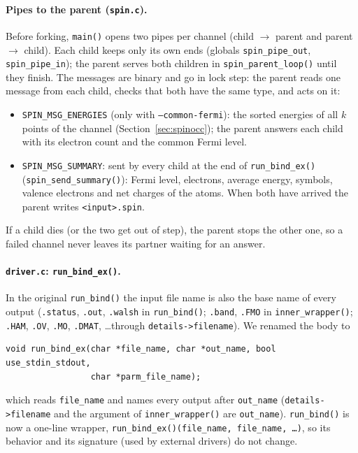 \documentclass[11pt,a4paper]{article}
\newcommand{\file}[1]{\texttt{#1}}
\newcommand{\fn}[1]{\texttt{#1()}}
\newcommand{\var}[1]{\texttt{#1}}
\newcommand{\opt}[1]{\texttt{#1}}
\begin{document}
\paragraph{Pipes to the parent (\file{spin.c}).} Before forking, \fn{main} opens two
pipes per channel (child $\to$ parent and parent $\to$ child). Each child keeps only its
own ends (globals \var{spin\_pipe\_out}, \var{spin\_pipe\_in}); the parent serves both
children in \fn{spin\_parent\_loop} until they finish. The messages are binary and go in
lock step: the parent reads one message from each child, checks that both have the same
type, and acts on it:
\begin{itemize}
\item \texttt{SPIN\_MSG\_ENERGIES} (only with \opt{--common-fermi}): the sorted energies of
  all $k$ points of the channel (Section~\ref{sec:spinocc}); the parent answers each child
  with its electron count and the common Fermi level.
\item \texttt{SPIN\_MSG\_SUMMARY}: sent by every child at the end of \fn{run\_bind\_ex}
  (\fn{spin\_send\_summary}): Fermi level, electrons, average energy, symbols, valence
  electrons and net charges of the atoms. When both have arrived the parent writes
  \texttt{<input>.spin}.
\end{itemize}
If a child dies (or the two get out of step), the parent stops the other one, so a
failed channel never leaves its partner waiting for an answer.

\paragraph{\file{driver.c}: \fn{run\_bind\_ex}.} In the original \fn{run\_bind} the input
file name is also the base name of every output (\texttt{.status}, \texttt{.out},
\texttt{.walsh} in \fn{run\_bind}; \texttt{.band}, \texttt{.FMO} in \fn{inner\_wrapper};
\texttt{.HAM}, \texttt{.OV}, \texttt{.MO}, \texttt{.DMAT}, \ldots through
\var{details->filename}). We renamed the body to
\begin{lstlisting}
void run_bind_ex(char *file_name, char *out_name, bool use_stdin_stdout,
                 char *parm_file_name);
\end{lstlisting}
which reads \var{file\_name} and names every output after \var{out\_name}
(\var{details->filename} and the argument of \fn{inner\_wrapper} are \var{out\_name}).
\fn{run\_bind} is now a one-line wrapper,
\fn{run\_bind\_ex}\texttt{(file\_name, file\_name, \ldots)}, so its behavior and its
signature (used by external drivers) do not change.
\end{document}
